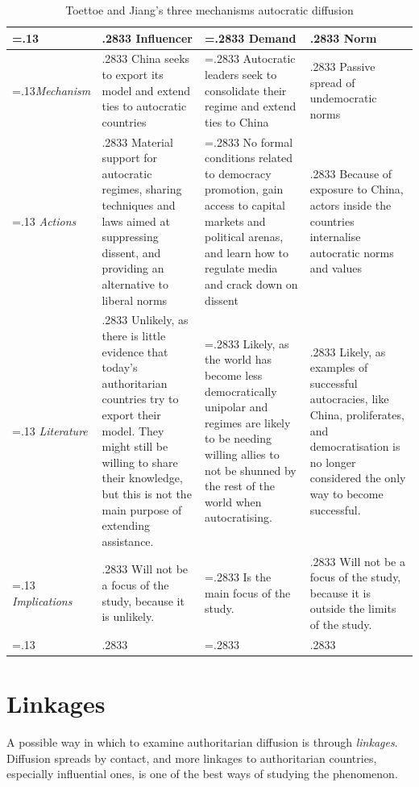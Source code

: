 \begin{table}[hbt!]
\centering
\caption{\label{tab:mechanism}Toettoe and Jiang's three mechanisms autocratic diffusion}
\begin{tabularx}{1\textwidth} {
 >{\noindent\justifying\arraybackslash\hsize=.13\hsize}X 
 >{\noindent\justifying\arraybackslash\hsize.2833\hsize}X 
 >{\noindent\justifying\arraybackslash\hsize=.2833\hsize}X 
 >{\noindent\justifying\arraybackslash\hsize.2833\hsize}X}
\toprule
& \textbf{Influencer} 
& \textbf{Demand}
& \textbf{Norm} \\
\midrule
\textit{Mechanism}
& China seeks to export its model and extend ties to autocratic countries 
& Autocratic leaders seek to consolidate their regime and extend ties to China 
& Passive spread of undemocratic norms \\
\addlinespace
\textit{Actions} 
& Material support for autocratic regimes, sharing techniques and laws aimed at suppressing dissent, and providing an alternative to liberal norms 
& No formal conditions related to democracy promotion, gain access to capital markets and political arenas, and learn how to regulate media and crack down on dissent 
& Because of exposure to China, actors inside the countries internalise autocratic norms and values \\
\addlinespace
\textit{Literature }
& Unlikely, as there is little evidence that today's authoritarian countries try to export their model. They might still be willing to share their knowledge, but this is not the main purpose of extending assistance.
& Likely, as the world has become less democratically unipolar and regimes are likely to be needing willing allies to not be shunned by the rest of the world when autocratising.
& Likely, as examples of successful autocracies, like China, proliferates, and democratisation is no longer considered the only way to become successful.\\
\addlinespace
\textit{Implications}
& Will not be a focus of the study, because it is unlikely.
& Is the main focus of the study.
& Will not be a focus of the study, because it is outside the limits of the study. \\
\bottomrule

 \multicolumn{4}{p{\textwidth}}{\raggedright{\textit{Mechanisms are found in \citet[pp. 29-31]{toettoe_foreign_2023}}}}

\end{tabularx}
\end{table}

\section{Linkages}
A possible way in which to examine authoritarian diffusion is through \textit{linkages}. Diffusion spreads by contact, and more linkages to authoritarian countries, especially influential ones, is one of the best ways of studying the phenomenon. 

